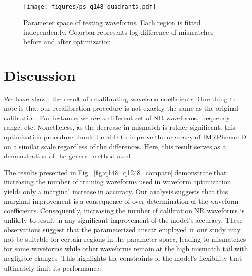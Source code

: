 \documentclass[twocolumn]{aastex631}
\begin{document}
\begin{figure}[t]
	\centering
	\texttt{[image: figures/ps\_q148\_quadrants.pdf]}
	\caption{Parameter space of testing waveforms. Each region is fitted independently. Colorbar
	represents log difference of mismatches before and after optimization.}
	\label{fig:ps_q148_quadrant}
\end{figure}

\section{Discussion} \label{sec:discussion}

We have shown the result of recalibrating waveform coefficients. One thing to
note is that our recalibration procedure is not exactly the same as the original
calibration. For instance, we use a different set of NR waveforms, frequency
range, etc. Nonetheless, as the decrease in mismatch is rather significant, this
optimization procedure should be able to improve the accuracy of IMRPhenomD on a
similar scale regardless of the differences. Here, this result serves as a
demonstration of the general method used.  

The results presented in Fig.~\ref{fig:q148_q1248_compare} demonstrate that
increasing the number of training waveforms used in waveform optimization yields
only a marginal increase in accuracy. Our analysis suggests that this marginal
improvement is a consequence of over-determination of the waveform coefficients.
Consequently, increasing the number of calibration NR waveforms is unlikely to
result in any significant improvement of the model's accuracy. These
observations suggest that the parameterized ansatz employed in our study may not
be suitable for certain regions in the parameter space, leading to mismatches
for some waveforms while other waveforms remain at the high mismatch tail with
negligible changes. This highlights the constraints of the model's flexibility
that ultimately limit its performance.
\end{document}
